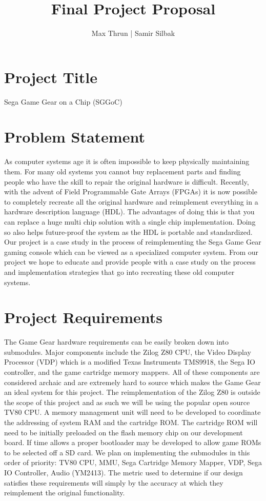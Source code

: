 \documentclass[11pt]{article}
\title{Final Project Proposal}
\author{ Max Thrun | Samir Silbak }
\begin{document}
\maketitle

\section*{Project Title}
Sega Game Gear on a Chip (SGGoC)

\section*{Problem Statement}
As computer systems age it is often impossible to keep physically maintaining them.
For many old systems you cannot buy replacement parts and finding people who have the skill
to repair the original hardware is difficult. Recently, with the advent of Field Programmable
Gate Arrays (FPGAs) it is now possible to completely recreate all the original hardware and reimplement
everything in a hardware description language (HDL). The advantages of doing this is that you can
replace a huge multi chip solution with a single chip implementation. Doing so also helps future-proof
the system as the HDL is portable and standardized. Our project is a case study in the process of
reimplementing the Sega Game Gear gaming console which can be viewed as a specialized computer system. 
From our project we hope to educate and provide people with a case study on the process and implementation 
strategies that go into recreating these old computer systems.

\section*{Project Requirements}
The Game Gear hardware requirements can be easily broken down into submodules. Major components include the Zilog Z80 CPU, 
the Video Display Processor (VDP) which is a modified Texas Instruments TMS9918, the Sega IO controller, and the
game cartridge memory mappers. All of these components are considered archaic and are extremely hard to source which makes
the Game Gear an ideal system for this project. The reimplementation of the Zilog Z80 is outside the scope of this project and as such
we will be using the popular open source TV80 CPU. A memory management unit will need to be developed to coordinate the 
addressing of system RAM and the cartridge ROM. The cartridge ROM will need to be initially preloaded on the flash memory chip on
our development board. If time allows a proper bootloader may be developed to allow game ROMs to be selected off a
SD card. We plan on implementing the submodules in this order of priority: TV80 CPU, MMU, Sega Cartridge Memory Mapper, VDP,
Sega IO Controller, Audio (YM2413). The metric used to determine if our design satisfies these requirements will simply
by the accuracy at which they reimplement the original functionality.
\end{document}
